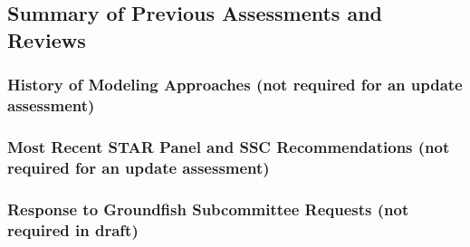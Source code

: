 \documentclass[11pt,
  english,
  a4paper,
]{article}
\begin{document}
\leavevmode\tagmcend\tagstructend\par


\hypertarget{summary-of-previous-assessments-and-reviews}{%
\subsection{Summary of Previous Assessments and Reviews}\label{summary-of-previous-assessments-and-reviews}}

\leavevmode\tagmcend\tagstructend


\hypertarget{history-of-modeling-approaches-not-required-for-an-update-assessment}{%
\subsubsection{History of Modeling Approaches (not required for an update assessment)}\label{history-of-modeling-approaches-not-required-for-an-update-assessment}}

\leavevmode\tagmcend\tagstructend


\hypertarget{most-recent-star-panel-and-ssc-recommendations-not-required-for-an-update-assessment}{%
\subsubsection{Most Recent STAR Panel and SSC Recommendations (not required for an update assessment)}\label{most-recent-star-panel-and-ssc-recommendations-not-required-for-an-update-assessment}}

\leavevmode\tagmcend\tagstructend


\hypertarget{response-to-groundfish-subcommittee-requests-not-required-in-draft}{%
\subsubsection{Response to Groundfish Subcommittee Requests (not required in draft)}\label{response-to-groundfish-subcommittee-requests-not-required-in-draft}}

\leavevmode\tagmcend\tagstructend

\end{document}
